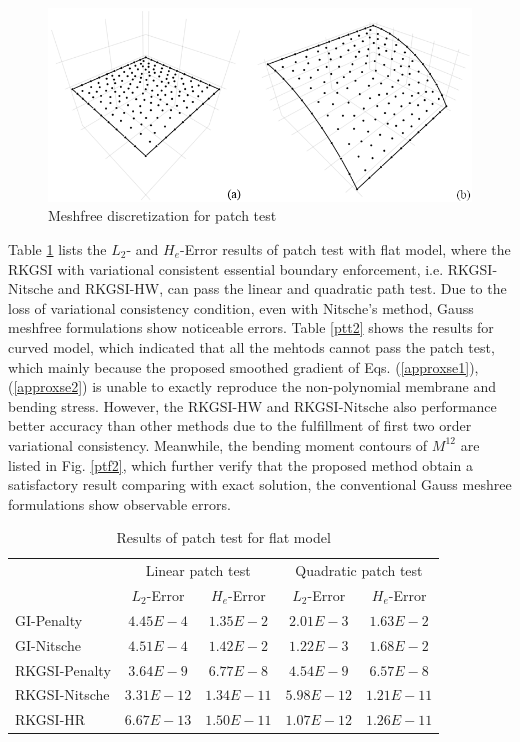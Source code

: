 \begin{figure}[h!]
    \centering
    \includegraphics[width=\textwidth]{figures/patchtest_msh}
    \caption{Meshfree discretization for patch test}\label{ptf1}
\end{figure}

Table \ref{ptt1} lists the $L_2$- and $H_e$-Error results of patch test with flat model, where the RKGSI with variational consistent essential boundary enforcement, i.e. RKGSI-Nitsche and RKGSI-HW, can pass the linear and quadratic path test. Due to the loss of variational consistency condition, even with Nitsche's method, Gauss meshfree formulations show noticeable errors. Table \ref{ptt2} shows the results for curved model, which indicated that all the mehtods cannot pass the patch test, which mainly because the proposed smoothed gradient of Eqs. (\ref{approxse1}), (\ref{approxse2}) is unable to exactly reproduce the non-polynomial membrane and bending stress. However, the RKGSI-HW and RKGSI-Nitsche also performance better accuracy than other methods due to the fulfillment of first two order variational consistency. Meanwhile, the bending moment contours of $M^{12}$ are listed in Fig. \ref{ptf2}, which further verify that the proposed method obtain a satisfactory result comparing with exact solution, the conventional Gauss meshree formulations show observable errors.

\begin{table}[h!]
\centering
\caption{Results of patch test for flat model}\label{ptt1}
\begin{tabular}{lcccc}
\toprule
 & \multicolumn{2}{c}{Linear patch test} & \multicolumn{2}{c}{Quadratic patch test} \\ \cline{2-5}
 & $L_2$-Error & $H_e$-Error & $L_2$-Error & $H_e$-Error \\
    \midrule
    GI-Penalty & $4.45E-4$ & $1.35E-2$ & $2.01E-3$ & $1.63E-2$ \\
    GI-Nitsche & $4.51E-4$ & $1.42E-2$ & $1.22E-3$ & $1.68E-2$ \\
    RKGSI-Penalty & $3.64E-9$ & $6.77E-8$ & $4.54E-9$ & $6.57E-8$ \\
    RKGSI-Nitsche & $3.31E-12$ & $1.34E-11$ & $5.98E-12$ & $1.21E-11$ \\
    RKGSI-HR & $6.67E-13$ & $1.50E-11$ & $1.07E-12$ & $1.26E-11$ \\
    \bottomrule
\end{tabular}
\end{table}

